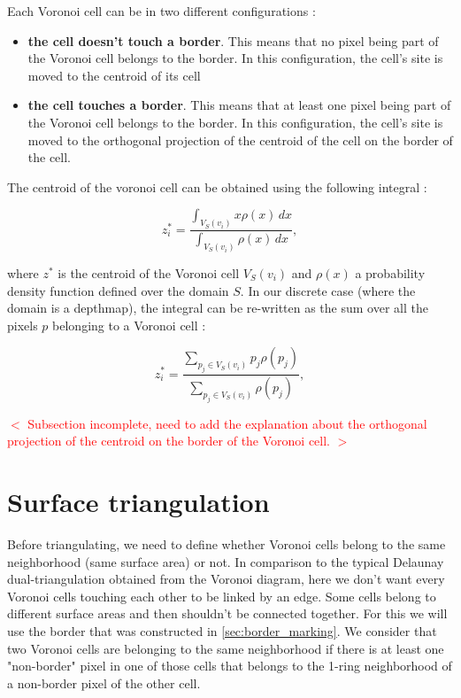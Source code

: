 \documentclass[11pt,fleqn]{book} %
\newcommand{\arnaud}[1]{\textcolor{red}{$<$ #1 $>$}}
\begin{document}
Each Voronoi cell can be in two different configurations : 
\begin{itemize}
	\item \textbf{the cell doesn't touch a border}. This means that no pixel being part of the Voronoi cell belongs to the border.
	In this configuration, the cell's site is moved to the centroid of its cell
	\item \textbf{the cell touches a border}. This means that at least one pixel being part of the Voronoi cell belongs to the border.
	In this configuration, the cell's site is moved to the orthogonal projection of the centroid of the cell on the border of the cell.
\end{itemize}

The centroid of the voronoi cell can be obtained using the following integral :

\begin{equation}
	z_i^* = \frac{\int_{V_S(v_i)} x\rho(x)\,dx}{\int_{V_S(v_i)} \rho(x)\,dx},
\end{equation}

where $z^*$ is the centroid of the Voronoi cell $V_S(v_i)$ and $\rho(x)$ a probability density function defined over the domain $S$.
In our discrete case (where the domain is a depthmap), the integral can be re-written as the sum over all the pixels $p$ belonging to a Voronoi cell : 

\begin{equation}
	z_i^* = \frac{\sum_{p_j \in V_S(v_i)} p_j\rho(p_j)}{\sum_{p_j \in V_S(v_i)} \rho(p_j)},
\end{equation}

\arnaud{Subsection incomplete, need to add the explanation about the orthogonal projection of the centroid on the border of the Voronoi cell.}

\section{Surface triangulation}
\label{sec:surface_triangulation}
Before triangulating, we need to define whether Voronoi cells belong to the same neighborhood (same surface area) or not. In comparison to the typical Delaunay dual-triangulation obtained from the Voronoi diagram, here we don't want every Voronoi cells touching each other to be linked by an edge. Some cells belong to different surface areas and then shouldn't be connected together.
For this we will use the border that was constructed in \ref{sec:border_marking}.
We consider that two Voronoi cells are belonging to the same neighborhood if there is at least one "non-border" pixel in one of those cells that belongs to the 1-ring neighborhood of a non-border pixel of the other cell.
\end{document}
